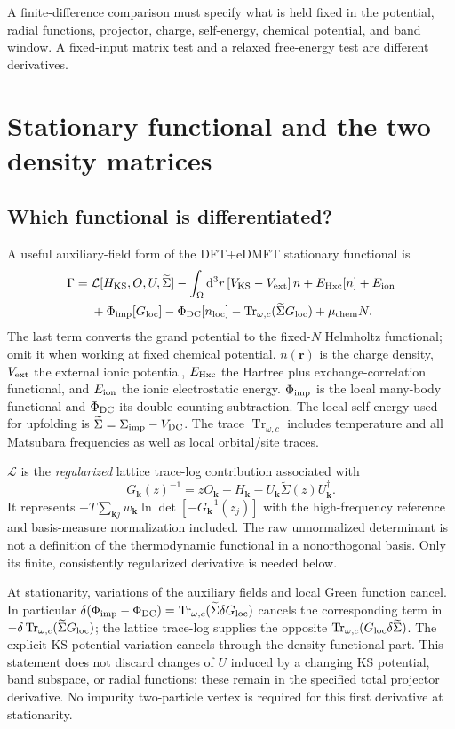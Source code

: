 \documentclass[11pt]{article}
\newcommand{\Tr}{\operatorname{Tr}}
\newcommand{\dd}{\mathrm d}
\newcommand{\kb}{\mathbf k}
\newcommand{\Sig}{\widetilde\Sigma}
\newcommand{\newpart}[1]{\par\Needspace{12\baselineskip}\section{#1}}
\begin{document}
A finite-difference comparison must specify what is held fixed in the
potential, radial functions, projector, charge, self-energy, chemical
potential, and band window. A fixed-input matrix test and a relaxed
free-energy test are different derivatives.

\newpart{Stationary functional and the two density matrices}
\label{sec:functional}
\subsection{Which functional is differentiated?}
A useful auxiliary-field form of the DFT+eDMFT stationary functional is
\begin{align}
 \Gamma={}&\mathcal L[H_{\rm KS},O,U,\Sig]
 -\int_\Omega\dd^3r\,[V_{\rm KS}-V_{\rm ext}]\,n
 +E_{\rm Hxc}[n]+E_{\rm ion}\notag\\
 &+\Phi_{\rm imp}[G_{\rm loc}]-\Phi_{\rm DC}[n_{\rm loc}]
 -\Tr_{\omega,c}(\Sig G_{\rm loc})
 +\mu_{\rm chem}N .
 \label{eq:gamma}
\end{align}
The last term converts the grand potential to the fixed-$N$ Helmholtz
functional; omit it when working at fixed chemical potential.
$n(\mathbf r)$ is the charge density, $V_{\rm ext}$ the external ionic
potential, $E_{\rm Hxc}$ the Hartree plus exchange-correlation functional,
and $E_{\rm ion}$ the ionic electrostatic energy.
$\Phi_{\rm imp}$ is the local many-body functional and $\Phi_{\rm DC}$ its
double-counting subtraction. The local self-energy used for upfolding is
$\Sig=\Sigma_{\rm imp}-V_{\rm DC}$.
The trace $\Tr_{\omega,c}$ includes temperature and all Matsubara
frequencies as well as local orbital/site traces.

$\mathcal L$ is the \emph{regularized} lattice trace-log contribution
associated with
\begin{equation}
 G_\kb(z)^{-1}=zO_\kb-H_\kb-U_\kb\Sig(z)U_\kb^\dagger.
 \label{eq:dyson}
\end{equation}
It represents $-T\sum_{\kb j}w_\kb\ln\det[-G_\kb^{-1}(z_j)]$ with the
high-frequency reference and basis-measure normalization included.
The raw unnormalized determinant is not a definition of the thermodynamic
functional in a nonorthogonal basis.
Only its finite, consistently regularized derivative is needed below.

At stationarity, variations of the auxiliary fields and local Green
function cancel. In particular
$\delta(\Phi_{\rm imp}-\Phi_{\rm DC})
=\Tr_{\omega,c}(\Sig\delta G_{\rm loc})$
cancels the corresponding term in
$-\delta\Tr_{\omega,c}(\Sig G_{\rm loc})$;
the lattice trace-log supplies the opposite
$\Tr_{\omega,c}(G_{\rm loc}\delta\Sig)$.
The explicit KS-potential variation cancels through the density-functional
part. This statement does not discard changes of $U$ induced by a changing
KS potential, band subspace, or radial functions: these remain in the
specified total projector derivative. No impurity two-particle vertex
is required for this first derivative at stationarity.
\end{document}
